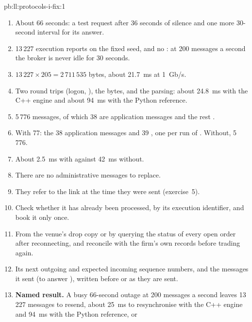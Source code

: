 \begin{solution}{pb:ll:protocols-i-fix:1}
\begin{enumerate}
\item About 66 seconds: a test request after 36 seconds of silence and one more 30-second interval for its answer.
\item 13\,227 execution reports on the fixed seed, and no : at 200 messages a second the broker is never idle for 30
seconds.
\item $13\,227 \times 205 = 2\,711\,535$ bytes, about \qty{21.7}{\milli\second} at 1~Gb/s.
\item Two round trips (logon, ), the bytes, and the parsing: about \qty{24.8}{\milli\second} with the C++
engine and about \qty{94}{\milli\second} with the Python reference.
\item 5\,776 messages, of which 38 are application messages and the rest .
\item With  77: the 38 application messages and 39 , one per run of . Without, 5\,776.
\item About \qty{2.5}{\milli\second} with  against \qty{42}{\milli\second} without.
\item There are no administrative messages to replace.
\item They refer to the link at the time they were sent (exercise~5).
\item Check whether it has already been processed, by its execution identifier, and book it only once.
\item From the venue's drop copy or by querying the status of every open order after reconnecting, and reconcile with the
firm's own records before trading again.
\item Its next outgoing and expected incoming sequence numbers, and the messages it sent (to answer ), written
before or as they are sent.
\item \textbf{Named result.} A busy 66-second outage at 200 messages a second leaves 13\,227 messages to resend, about
\qty{25}{\milli\second} to resynchronise with the C++ engine and \qty{94}{\milli\second} with the Python reference,  or

\end{enumerate}
\end{solution}
